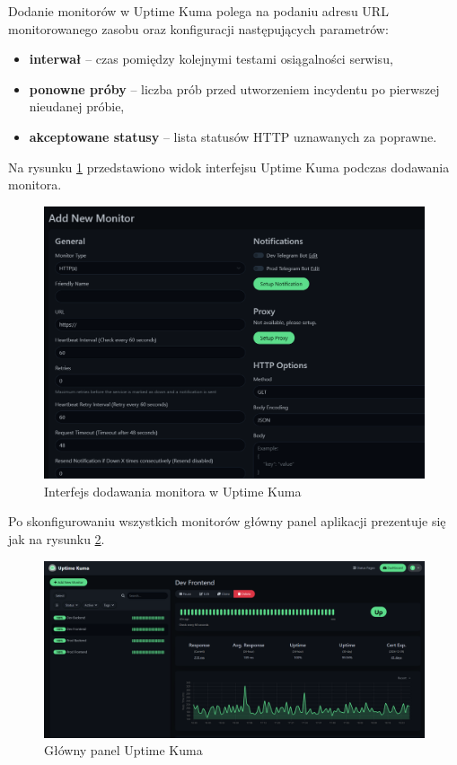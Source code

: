 \documentclass{article}
\begin{document}
Dodanie monitorów w Uptime Kuma polega na podaniu adresu URL monitorowanego zasobu oraz konfiguracji następujących parametrów:
\begin{itemize}
    \item \textbf{interwał} – czas pomiędzy kolejnymi testami osiągalności serwisu,
    \item \textbf{ponowne próby} – liczba prób przed utworzeniem incydentu po pierwszej nieudanej próbie,
    \item \textbf{akceptowane statusy} – lista statusów HTTP uznawanych za poprawne.
\end{itemize}

Na rysunku \ref{fig:add-monitor} przedstawiono widok interfejsu Uptime Kuma podczas dodawania monitora.

\begin{figure}[H]
    \centering
    \includegraphics[width=1\linewidth]{uptimeKumaDodawanieMonitora.png}
    \caption{Interfejs dodawania monitora w Uptime Kuma}
    \label{fig:add-monitor}
\end{figure}

Po skonfigurowaniu wszystkich monitorów główny panel aplikacji prezentuje się jak na rysunku \ref{fig:dashboard}.

\begin{figure}[H]
    \centering
    \includegraphics[width=1\linewidth]{uptimeKumaDashboard.png}
    \caption{Główny panel Uptime Kuma}
    \label{fig:dashboard}
\end{figure}
\end{document}
